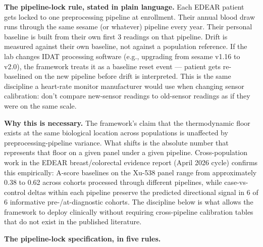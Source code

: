 \documentclass[12pt,a4paper]{article}
\begin{document}
\textbf{The pipeline-lock rule, stated in plain language.} Each EDEAR
patient gets locked to one preprocessing pipeline at enrollment. Their
annual blood draw runs through the same sesame (or whatever) pipeline
every year. Their personal baseline is built from their own first 3
readings on that pipeline. Drift is measured against their own
baseline, not against a population reference. If the lab changes IDAT
processing software (e.g., upgrading from sesame v1.16 to v2.0), the
framework treats it as a baseline reset event --- patient gets
re-baselined on the new pipeline before drift is interpreted. This is
the same discipline a heart-rate monitor manufacturer would use when
changing sensor calibration: don't compare new-sensor readings to
old-sensor readings as if they were on the same scale.

\textbf{Why this is necessary.} The framework's claim that the
thermodynamic floor exists at the same biological location across
populations is unaffected by preprocessing-pipeline variance. What
shifts is the absolute number that represents that floor on a given
panel under a given pipeline. Cross-population work in the EDEAR
breast/colorectal evidence report (April 2026 cycle) confirms this
empirically: A-score baselines on the Xu-538 panel range from
approximately 0.38 to 0.62 across cohorts processed through different
pipelines, while case-vs-control deltas within each pipeline preserve
the predicted directional signal in 6 of 6 informative pre-/at-diagnostic
cohorts. The discipline below is what allows the framework to deploy
clinically without requiring cross-pipeline calibration tables that do
not exist in the published literature.

\textbf{The pipeline-lock specification, in five rules.}
\end{document}
